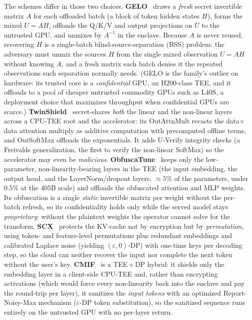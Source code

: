 The schemes differ in those two choices. \textbf{GELO}~\citep{belikov_gelo} draws a
\emph{fresh} secret invertible matrix $A$ for each offloaded batch (a block of token
hidden states $H$), forms the mixed $U{=}AH$, offloads the Q/K/V and output projections on
$U$ to the untrusted GPU, and unmixes by $A^{-1}$ in the enclave. Because $A$ is never
reused, recovering $H$ is a single-batch blind-source-separation (BSS) problem: the adversary must
unmix the sources $H$ from the single mixed observation $U{=}AH$ without knowing $A$, and a fresh
matrix each batch denies it the repeated observations such separation normally needs. (GELO is the
family's outlier on hardware: its trusted core is a \emph{confidential} GPU, an
H200-class TEE, and it offloads to a pool of cheaper untrusted commodity GPUs such as
L40S, a deployment choice that maximizes throughput when confidential GPUs are
scarce.) \textbf{TwinShield}~\citep{xue_twinshield} secret-shares \emph{both} the linear
and the non-linear layers across a CPU-TEE root and the accelerator: its OutAttnMult
recasts the data$\times$data attention multiply as additive computation with precomputed
offline terms, and OutSoftMax offloads the exponentials. It adds U-Verify integrity
checks (a Freivalds generalization, the first to verify the non-linear SoftMax) so the
accelerator may even be \emph{malicious}. \textbf{ObfuscaTune}~\citep{frikha_obfuscatune} keeps only the low-parameter, non-linearity-bearing
layers in the TEE (the input embedding, the output head, and the LayerNorm/dropout layers,
${\approx}5\%$ of the parameters, under $0.5\%$ at the $405$B scale) and offloads the obfuscated
attention and MLP weights. Its obfuscation is a single \emph{static} invertible matrix per
weight without the per-batch refresh, so its confidentiality holds
only while the served model stays \emph{proprietary}: without the plaintext weights the operator
cannot solve for the transform.
\textbf{SCX}~\citep{yuan_scx} protects the KV-cache not by encryption but by
\emph{permutation}, using token- and feature-level permutations plus redundant embeddings and
calibrated Laplace noise (yielding $(\varepsilon,0)$-DP) with one-time keys per decoding
step, so the cloud can neither recover the input nor complete the next token without the
user's key. \textbf{CMIF}~\citep{cmif} is a TEE\,+\,DP hybrid: it shields only the
embedding layer in a client-side CPU-TEE and, rather than encrypting activations (which
would force every non-linearity back into the enclave and pay the round-trip per layer),
it sanitizes the \emph{input tokens} with an optimized Report-Noisy-Max mechanism
($\varepsilon$-DP token substitution), so the sanitized sequence runs entirely on the
untrusted GPU with no per-layer return.


